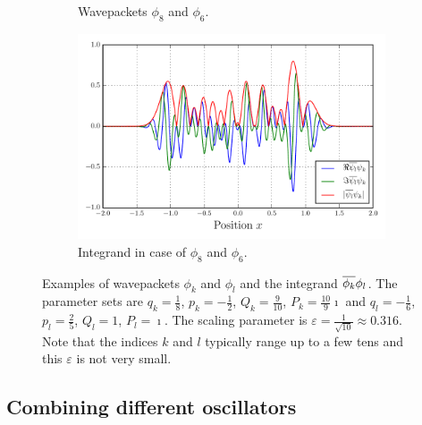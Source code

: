\documentclass[a4paper,10pt]{article}
\begin{document}
\begin{figure}[h!]
\begin{subfigure}[t]{0.5\linewidth}
    \caption{Wavepackets $\phi_8$ and $\phi_6$.}
    \label{fig:overlap_example_wavepackets_2}
  \end{subfigure}
  \begin{subfigure}[t]{0.5\linewidth}
    \includegraphics[width=\linewidth]{./fig/overlap_integrand_2.pdf}
    \caption{Integrand in case of $\phi_8$ and $\phi_6$.}
    \label{fig:overlap_example_integrand_2}
  \end{subfigure}
  \caption{\label{fig:overlap_example}
  Examples of wavepackets $\phi_k$ and $\phi_l$ and the integrand $\overline{\phi_k} \phi_l$.
  The parameter sets are
  $q_k = \frac{1}{8}$, $p_k = -\frac{1}{2}$,
  $Q_k = \frac{9}{10}$, $P_k = \frac{10}{9}\imath$
  and
  $q_l = -\frac{1}{6}$, $p_l = \frac{2}{5}$,
  $Q_l = 1$, $P_l = \imath$.
  The scaling parameter is $\varepsilon = \frac{1}{\sqrt{10}} \approx 0.316$.
  Note that the indices $k$ and $l$ typically range up to a few tens
  and this $\varepsilon$ is not very small.}
\end{figure}


\subsection{Combining different oscillators}
\end{document}

